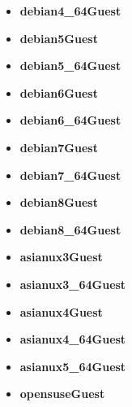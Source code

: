 \begin{itemize}
\item \textbf{debian4\_64Guest} 
\end{itemize}
\begin{itemize}
\item \textbf{debian5Guest} 
\end{itemize}
\begin{itemize}
\item \textbf{debian5\_64Guest} 
\end{itemize}
\begin{itemize}
\item \textbf{debian6Guest} 
\end{itemize}
\begin{itemize}
\item \textbf{debian6\_64Guest} 
\end{itemize}
\begin{itemize}
\item \textbf{debian7Guest} 
\end{itemize}
\begin{itemize}
\item \textbf{debian7\_64Guest} 
\end{itemize}
\begin{itemize}
\item \textbf{debian8Guest} 
\end{itemize}
\begin{itemize}
\item \textbf{debian8\_64Guest} 
\end{itemize}
\begin{itemize}
\item \textbf{asianux3Guest} 
\end{itemize}
\begin{itemize}
\item \textbf{asianux3\_64Guest} 
\end{itemize}
\begin{itemize}
\item \textbf{asianux4Guest} 
\end{itemize}
\begin{itemize}
\item \textbf{asianux4\_64Guest} 
\end{itemize}
\begin{itemize}
\item \textbf{asianux5\_64Guest} 
\end{itemize}
\begin{itemize}
\item \textbf{opensuseGuest} 
\end{itemize}
